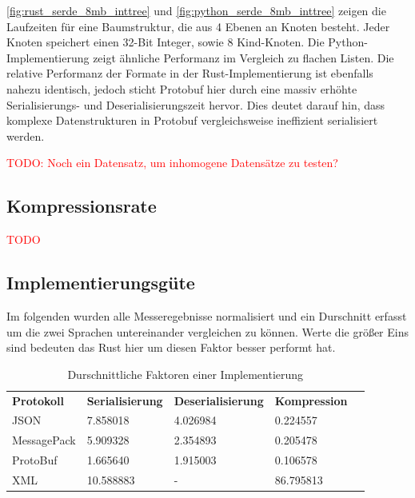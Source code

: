 \documentclass[ngerman]{seminarvorlage}
\begin{document}
\autoref{fig:rust_serde_8mb_inttree} und \autoref{fig:python_serde_8mb_inttree} zeigen die Laufzeiten für eine Baumstruktur, die aus 4 Ebenen an Knoten besteht. Jeder Knoten speichert einen 32-Bit Integer, sowie 8 Kind-Knoten. Die Python-Implementierung zeigt ähnliche Performanz im Vergleich zu flachen Listen. Die relative Performanz der Formate in der Rust-Implementierung ist ebenfalls nahezu identisch, jedoch sticht Protobuf hier durch eine massiv erhöhte Serialisierungs- und Deserialisierungszeit hervor. Dies deutet darauf hin, dass komplexe Datenstrukturen in Protobuf vergleichsweise ineffizient serialisiert werden.

\textcolor{red}{TODO: Noch ein Datensatz, um inhomogene Datensätze zu testen?}

\subsection{Kompressionsrate}

\textcolor{red}{TODO}

\subsection{Implementierungsgüte}
Im folgenden wurden alle Messeregebnisse normalisiert und ein Durschnitt erfasst um die zwei Sprachen untereinander vergleichen zu können. Werte die größer Eins sind bedeuten das Rust hier um diesen Faktor besser performt hat.

\begin{table}[H]
    \begin{tabular}{|l|l|l|l|l}
    \cline{1-4}
    \textbf{Protokoll} & \textbf{Serialisierung} & \textbf{Deserialisierung} & \textbf{Kompression} &  \\ \cline{1-4}
    JSON               & 7.858018                & 4.026984                  & 0.224557               &  \\ \cline{1-4}
    MessagePack        & 5.909328                & 2.354893                  & 0.205478               &  \\ \cline{1-4}
    ProtoBuf           & 1.665640                & 1.915003                  & 0.106578               &  \\ \cline{1-4}
    XML                & 10.588883               & -                         & 86.795813              &  \\ \cline{1-4}
    \end{tabular}
    \caption{Durschnittliche Faktoren einer Implementierung}
\end{table}
\end{document}
